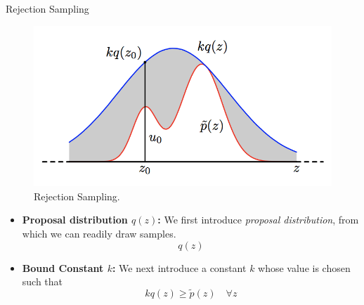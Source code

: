 \documentclass{bredelebeamer}
\begin{document}
\begin{frame}{Rejection Sampling}
  \begin{figure}
  \centering
  \includegraphics[scale=0.35]{rej_sampling.png}
  \caption{
    Rejection Sampling.
  }
  \end{figure}
  \begin{itemize}
    \item \textbf{Proposal distribution $q(z)$:} We first introduce
    \textit{proposal distribution}, from which we can readily draw samples.
    \begin{equation}
      q(z)
    \end{equation}
    \item \textbf{Bound Constant $k$:} We next introduce a constant $k$
    whose value is chosen such that
    \begin{equation}
      kq(z) \geq \tilde{p}(z) \quad \forall z
    \end{equation}
  \end{itemize}
\end{frame}
\end{document}
